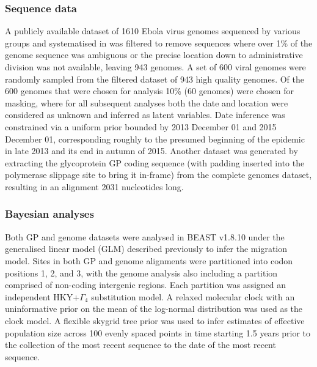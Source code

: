 \documentclass[11pt,oneside,letterpaper]{article}
\begin{document}
\subsubsection*{Sequence data}
A publicly available dataset of 1610 Ebola virus genomes sequenced by various groups \citep{baize_emergence_2014,gire_genomic_2014,park_ebola_2015,carroll_temporal_2015,kugelman_monitoring_2015,ladner_evolution_2015,simon-loriere_distinct_2015,tong_genetic_2015,arias_rapid_2016,smits_genotypic_2015,quick_rapid_2015} and systematised in \cite{dudas_virus_2017} was filtered to remove sequences where over 1\% of the genome sequence was ambiguous or the precise location down to administrative division was not available, leaving 943 genomes.
A set of 600 viral genomes were randomly sampled from the filtered dataset of 943 high quality genomes.
Of the 600 genomes that were chosen for analysis 10\% (60 genomes) were chosen for masking, where for all subsequent analyses both the date and location were considered as unknown and inferred as latent variables.
Date inference was constrained via a uniform prior bounded by 2013 December 01 and 2015 December 01, corresponding roughly to the presumed beginning of the epidemic in late 2013 and its end in autumn of 2015.
Another dataset was generated by extracting the glycoprotein GP coding sequence (with padding inserted into the polymerase slippage site to bring it in-frame) from the complete genomes dataset, resulting in an alignment 2031 nucleotides long.

\subsubsection*{Bayesian analyses}
Both GP and genome datasets were analysed in BEAST v1.8.10 \citep{suchard_bayesian_2018} under the generalised linear model (GLM) described previously \citep{faria_simultaneously_2013,lemey_unifying_2014,dudas_virus_2017} to infer the migration model.
Sites in both GP and genome alignments were partitioned into codon positions 1, 2, and 3, with the genome analysis also including a partition comprised of non-coding intergenic regions.
Each partition was assigned an independent HKY+$\Gamma_{4}$ \citep{hky_1985,yang_1994} substitution model.
A relaxed molecular clock \citep{drummond_2006} with an uninformative prior on the mean \citep{ferreira_bayesian_nodate} of the log-normal distribution was used as the clock model.
A flexible skygrid tree prior \citep{gill_2013} was used to infer estimates of effective population size across 100 evenly spaced points in time starting 1.5 years prior to the collection of the most recent sequence to the date of the most recent sequence.
\end{document}
